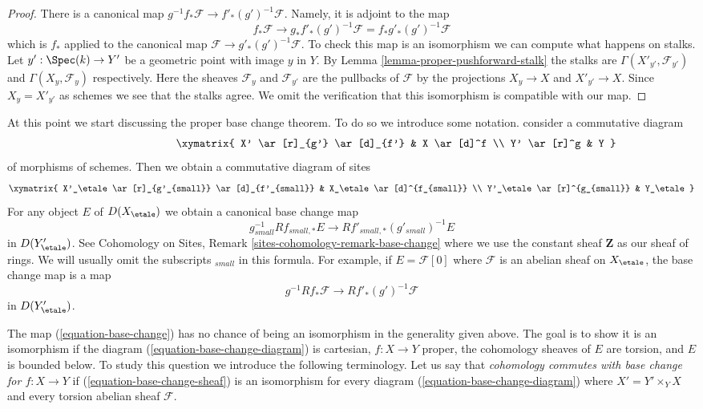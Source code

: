 \begin{proof}
There is a canonical map $g^{-1}f_*\mathcal{F} \to f'_*(g')^{-1}\mathcal{F}$.
Namely, it is adjoint to the map
$$
f_*\mathcal{F} \longrightarrow
g_*f'_*(g')^{-1}\mathcal{F} = f_*g'_*(g')^{-1}\mathcal{F}
$$
which is $f_*$ applied to the canonical map
$\mathcal{F} \to g'_*(g')^{-1}\mathcal{F}$. To check this map is an
isomorphism we can compute what happens on stalks.
Let $y' : \Spec(k) \to Y'$ be a geometric point with image $y$ in $Y$.
By Lemma \ref{lemma-proper-pushforward-stalk} the stalks are
$\Gamma(X'_{y'}, \mathcal{F}_{y'})$ and $\Gamma(X_y, \mathcal{F}_y)$
respectively. Here the sheaves $\mathcal{F}_y$ and $\mathcal{F}_{y'}$
are the pullbacks of $\mathcal{F}$ by the projections $X_y \to X$
and $X'_{y'} \to X$. Since $X_y = X'_{y'}$ as schemes
we see that the stalks agree. We omit the
verification that this isomorphism is compatible with our map.
\end{proof}

\noindent
At this point we start discussing the proper base change theorem.
To do so we introduce some notation. consider a commutative diagram
\begin{equation}
\label{equation-base-change-diagram}
\vcenter{
\xymatrix{
X' \ar[r]_{g'} \ar[d]_{f'} & X \ar[d]^f \\
Y' \ar[r]^g & Y
}
}
\end{equation}
of morphisms of schemes. Then we obtain a commutative diagram of sites
$$
\xymatrix{
X'_\etale \ar[r]_{g'_{small}} \ar[d]_{f'_{small}} &
X_\etale \ar[d]^{f_{small}} \\
Y'_\etale \ar[r]^{g_{small}} &
Y_\etale
}
$$
For any object $E$ of $D(X_\etale)$ we obtain a canonical base change map
\begin{equation}
\label{equation-base-change}
g_{small}^{-1}Rf_{small, *}E \longrightarrow Rf'_{small, *}(g'_{small})^{-1}E
\end{equation}
in $D(Y'_\etale)$. See Cohomology on Sites, Remark
\ref{sites-cohomology-remark-base-change} where we use the constant
sheaf $\mathbf{Z}$ as our sheaf of rings.
We will usually omit the subscripts ${}_{small}$ in this formula.
For example, if $E = \mathcal{F}[0]$ where $\mathcal{F}$ is an abelian
sheaf on $X_\etale$, the base change map is a map
\begin{equation}
\label{equation-base-change-sheaf}
g^{-1}Rf_*\mathcal{F} \longrightarrow Rf'_*(g')^{-1}\mathcal{F}
\end{equation}
in $D(Y'_\etale)$.

\medskip\noindent
The map (\ref{equation-base-change}) has no chance of being an isomorphism
in the generality given above. The goal is to show
it is an isomorphism if the diagram (\ref{equation-base-change-diagram})
is cartesian, $f : X \to Y$ proper, the cohomology sheaves of $E$
are torsion, and $E$ is bounded below.
To study this question we introduce the following terminology.
Let us say that {\it cohomology commutes with base change
for $f : X \to Y$} if (\ref{equation-base-change-sheaf})
is an isomorphism for every diagram (\ref{equation-base-change-diagram})
where $X' = Y' \times_Y X$ and every torsion abelian sheaf $\mathcal{F}$.

